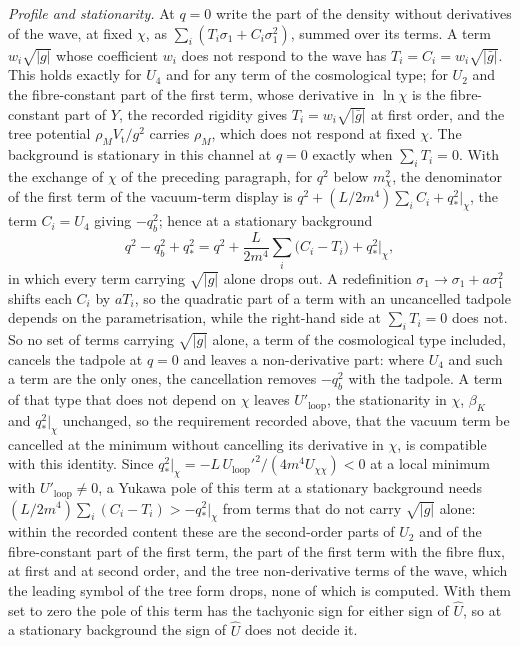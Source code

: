 \emph{Profile and stationarity.} At \(q=0\) write the part of the density without derivatives of the wave, at fixed \(\chi\), as \(\sum_i(T_i\sigma_1+C_i\sigma_1^2)\), summed over its terms. A term \(w_i\sqrt{|g|}\) whose coefficient \(w_i\) does not respond to the wave has \(T_i=C_i=w_i\sqrt{|\bar g|}\). This holds exactly for \(U_4\) and for any term of the cosmological type; for \(U_2\) and the fibre-constant part of the first term, whose derivative in \(\ln\chi\) is the fibre-constant part of \(Y\), the recorded rigidity gives \(T_i=w_i\sqrt{|\bar g|}\) at first order, and the tree potential \(\rho_MV_{\mathrm t}/g^2\) carries \(\rho_M\), which does not respond at fixed \(\chi\). The background is stationary in this channel at \(q=0\) exactly when \(\sum_iT_i=0\). With the exchange of \(\chi\) of the preceding paragraph, for \(q^2\) below \(m_\chi^2\), the denominator of the first term of the vacuum-term display is \(q^2+(L/2m^4)\sum_iC_i+q_*^2|_\chi\), the term \(C_i=U_4\) giving \(-q_b^2\); hence at a stationary background
\[
q^2-q_b^2+q_*^2=q^2+\frac{L}{2m^4}\sum_i\bigl(C_i-T_i\bigr)+q_*^2\big|_\chi ,
\]
in which every term carrying \(\sqrt{|g|}\) alone drops out. A redefinition \(\sigma_1\to\sigma_1+a\sigma_1^2\) shifts each \(C_i\) by \(aT_i\), so the quadratic part of a term with an uncancelled tadpole depends on the parametrisation, while the right-hand side at \(\sum_iT_i=0\) does not. So no set of terms carrying \(\sqrt{|g|}\) alone, a term of the cosmological type included, cancels the tadpole at \(q=0\) and leaves a non-derivative part: where \(U_4\) and such a term are the only ones, the cancellation removes \(-q_b^2\) with the tadpole. A term of that type that does not depend on \(\chi\) leaves \(U'_{\mathrm{loop}}\), the stationarity in \(\chi\), \(\beta_K\) and \(q_*^2|_\chi\) unchanged, so the requirement recorded above, that the vacuum term be cancelled at the minimum without cancelling its derivative in \(\chi\), is compatible with this identity. Since \(q_*^2|_\chi=-L\,U_{\mathrm{loop}}'^2/(4m^4U_{\chi\chi})<0\) at a local minimum with \(U'_{\mathrm{loop}}\ne0\), a Yukawa pole of this term at a stationary background needs \((L/2m^4)\sum_i(C_i-T_i)>-q_*^2|_\chi\) from terms that do not carry \(\sqrt{|g|}\) alone: within the recorded content these are the second-order parts of \(U_2\) and of the fibre-constant part of the first term, the part of the first term with the fibre flux, at first and at second order, and the tree non-derivative terms of the wave, which the leading symbol of the tree form drops, none of which is computed. With them set to zero the pole of this term has the tachyonic sign for either sign of \(\hat U\), so at a stationary background the sign of \(\hat U\) does not decide it.

